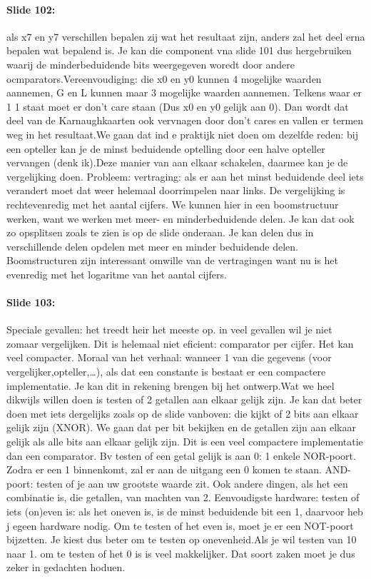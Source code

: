 \documentclass[10pt,a4paper]{book}
\begin{document}
\paragraph{Slide 102:} als x7 en y7 verschillen bepalen zij wat het resultaat zijn, anders zal het deel erna bepalen wat bepalend is. Je kan die component vna slide 101 dus hergebruiken waarij de minderbeduidende bits weergegeven woredt door andere ocmparators.Vereenvoudiging: die x0 en y0 kunnen 4 mogelijke waarden aannemen, G en L kunnen maar 3 mogelijke waarden aannemen. Telkens waar er 1 1 staat moet er don't care staan (Dus x0 en y0 gelijk aan 0). Dan wordt dat deel van de Karnaughkaarten ook vervnagen door don't cares en vallen er termen weg in het resultaat.We gaan dat ind e praktijk niet doen om dezelfde reden: bij een opteller kan je de minst beduidende optelling door een halve opteller vervangen (denk ik).Deze manier van aan elkaar schakelen, daarmee kan je de vergelijking doen. Probleem: vertraging: als er aan het minst beduidende deel iets verandert moet dat weer helemaal doorrimpelen naar links. De vergelijking is rechtevenredig met het aantal cijfers. We kunnen hier in een boomstructuur werken, want we werken met meer- en minderbeduidende delen. Je kan dat ook zo opsplitsen zoals te zien is op de slide onderaan. Je kan delen dus in verschillende delen opdelen met meer en minder beduidende delen. Boomstructuren zijn interessant omwille van de vertragingen want nu is het evenredig met het logaritme van het aantal cijfers.

\paragraph{Slide 103:} Speciale gevallen: het treedt heir het meeste op. in veel gevallen wil je niet zomaar vergelijken. Dit is helemaal niet eficient: comparator per cijfer. Het kan veel compacter. Moraal van het verhaal: wanneer 1 van die gegevens (voor vergelijker,opteller,\ldots), als dat een constante is bestaat er een compactere implementatie. Je kan dit in rekening brengen bij het ontwerp.Wat we heel dikwijls willen doen is testen of 2 getallen aan elkaar gelijk zijn. Je kan dat beter doen met iets dergelijks zoals op de slide vanboven: die kijkt of 2 bits aan elkaar gelijk zijn (XNOR). We gaan dat per bit bekijken en de getallen zijn aan elkaar gelijk als alle bits aan elkaar gelijk zijn. Dit is een veel compactere implementatie dan een comparator. Bv testen of een getal gelijk is aan 0: 1 enkele NOR-poort. Zodra er een 1 binnenkomt, zal er aan de uitgang een 0 komen te staan. AND-poort: testen of je aan uw grootste waarde zit. Ook andere dingen, als het een combinatie is, die getallen, van machten van 2. Eenvoudigste hardware: testen of iets (on)even is: als het oneven is, is de minst beduidende bit een 1, daarvoor heb j egeen hardware nodig. Om te testen of het even is, moet je er een NOT-poort bijzetten. Je kiest dus beter om te testen op onevenheid.Als je wil testen van 10 naar 1. om te testen of het 0 is is veel makkelijker. Dat soort zaken moet je dus zeker in gedachten hoduen.
\end{document}

